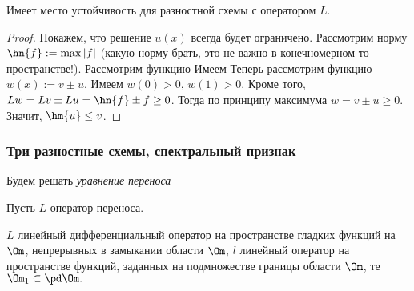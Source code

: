 \documentclass[a4paper]{article}
\begin{document}
\begin{stm}
Имеет место устойчивость для разностной схемы с оператором $L$.
\end{stm}
\begin{proof}
Покажем, что решение $u(x)$ всегда будет ограничено.  Рассмотрим норму
$\hn{f} := \max |f|$ (какую норму брать, это не важно в конечномерном
то пространстве!).  Рассмотрим функцию   Имеем   Теперь
рассмотрим функцию $w(x):= v \pm u$.  Имеем $w(0) > 0$, $w(1) >
0$. Кроме того, $L w = L v \pm L u = \hn{f} \pm f \ge 0$.  Тогда по
принципу максимума $w = v \pm u \ge 0$. Значит, $\hm{u}\le v$.
\end{proof}

\subsubsection{Три разностные схемы, спектральный признак}

Будем решать \emph{уравнение переноса} 

Пусть $L$ оператор переноса.

$L$ линейный дифференциальный оператор на пространстве гладких функций
на $\Om$, непрерывных в замыкании области $\Om$, $l$ линейный оператор
на пространстве функций, заданных на подмножестве границы области
$\Om$, те $\Om_1\subset\pd\Om.$
\end{document}
